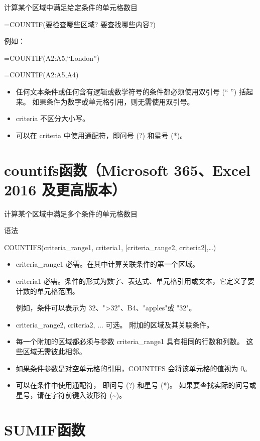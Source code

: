 计算某个区域中满足给定条件的单元格数目

=COUNTIF(要检查哪些区域? 要查找哪些内容?)

例如：

=COUNTIF(A2:A5,``London'')

=COUNTIF(A2:A5,A4)

\begin{itemize}
    \item 任何文本条件或任何含有逻辑或数学符号的条件都必须使用双引号 (`` \quad '') 括起来。 如果条件为数字或单元格引用，则无需使用双引号。
    \item criteria 不区分大小写。
    \item 可以在 criteria 中使用通配符，即问号 (?) 和星号 (*)。 
\end{itemize}

\section{countifs函数（Microsoft 365、Excel 2016 及更高版本）}

计算某个区域中满足多个条件的单元格数目

语法

COUNTIFS(criteria\_range1, criteria1, [criteria\_range2, criteria2],…)

\begin{itemize}
    \item criteria\_range1 必需。在其中计算关联条件的第一个区域。
    \item criteria1 必需。条件的形式为数字、表达式、单元格引用或文本，它定义了要计数的单元格范围。
    
    例如，条件可以表示为 32、">32"、B4、"apples"或 "32"。
    \item criteria\_range2, criteria2, ...    可选。 附加的区域及其关联条件。
    \item 每一个附加的区域都必须与参数 criteria\_range1 具有相同的行数和列数。 这些区域无需彼此相邻。
    \item 如果条件参数是对空单元格的引用，COUNTIFS 会将该单元格的值视为 0。
    \item 可以在条件中使用通配符， 即问号 (?) 和星号 (*)。 如果要查找实际的问号或星号，请在字符前键入波形符 (\textasciitilde)。
\end{itemize}

\section{SUMIF函数}

